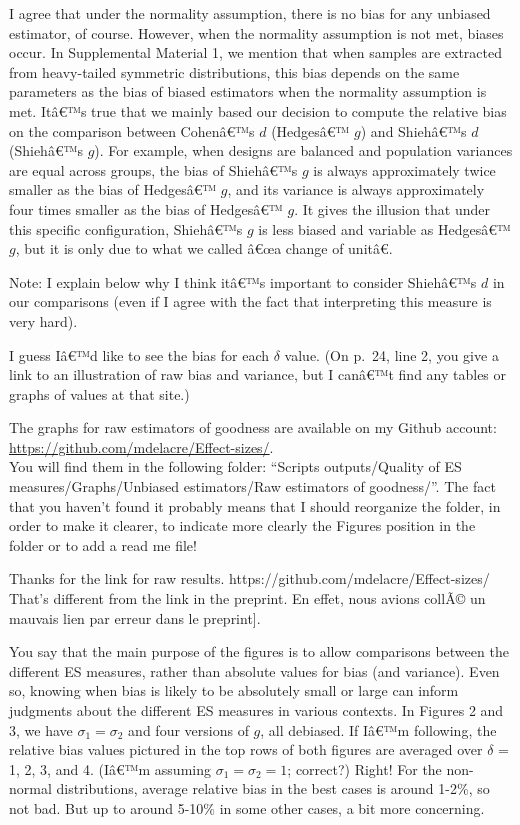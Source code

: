 \begin{appendix}
\color{blue} I agree that under the normality assumption, there is no
bias for any unbiased estimator, of course. However, when the normality
assumption is not met, biases occur. In Supplemental Material 1, we
mention that when samples are extracted from heavy-tailed symmetric
distributions, this bias depends on the same parameters as the bias of
biased estimators when the normality assumption is met. Itâ€™s true that
we mainly based our decision to compute the relative bias on the
comparison between Cohenâ€™s \(d\) (Hedgesâ€™ \(g\)) and Shiehâ€™s \(d\)
(Shiehâ€™s \(g\)). For example, when designs are balanced and population
variances are equal across groups, the bias of Shiehâ€™s \(g\) is always
approximately twice smaller as the bias of Hedgesâ€™ \(g\), and its
variance is always approximately four times smaller as the bias of
Hedgesâ€™ \(g\). It gives the illusion that under this specific
configuration, Shiehâ€™s \(g\) is less biased and variable as Hedgesâ€™
\(g\), but it is only due to what we called â€œa change of unitâ€.

Note: I explain below why I think itâ€™s important to consider Shiehâ€™s
\(d\) in our comparisons (even if I agree with the fact that
interpreting this measure is very hard).

\color{black} I guess Iâ€™d like to see the bias for each \(\delta\)
value. (On p.~24, line 2, you give a link to an illustration of raw bias
and variance, but I canâ€™t find any tables or graphs of values at that
site.)

\color{blue} The graphs for raw estimators of goodness are available on
my Github account:\\
\underline{https://github.com/mdelacre/Effect-sizes/}.\\
You will find them in the following folder: ``Scripts outputs/Quality of
ES measures/Graphs/Unbiased estimators/Raw estimators of goodness/''.
The fact that you haven't found it probably means that I should
reorganize the folder, in order to make it clearer, to indicate more
clearly the Figures position in the folder or to add a read me file!

\color{brown} Thanks for the link for raw results.
https://github.com/mdelacre/Effect-sizes/ That's different from the link
in the preprint. \color{darkgray}{[}En effet, nous avions collÃ© un
mauvais lien par erreur dans le preprint{]}.

\color{black} You say that the main purpose of the figures is to allow
comparisons between the different ES measures, rather than absolute
values for bias (and variance). Even so, knowing when bias is likely to
be absolutely small or large can inform judgments about the different ES
measures in various contexts. In Figures 2 and 3, we have
\(\sigma_1=\sigma_2\) and four versions of \(g\), all debiased. If Iâ€™m
following, the relative bias values pictured in the top rows of both
figures are averaged over \(\delta\) = 1, 2, 3, and 4. (Iâ€™m assuming
\(\sigma_1=\sigma_2=1\); correct?) \color{blue} Right! \color{black} For
the non-normal distributions, average relative bias in the best cases is
around 1-2\(\%\), so not bad. But up to around 5-10\(\%\) in some other
cases, a bit more concerning.


\end{appendix}
